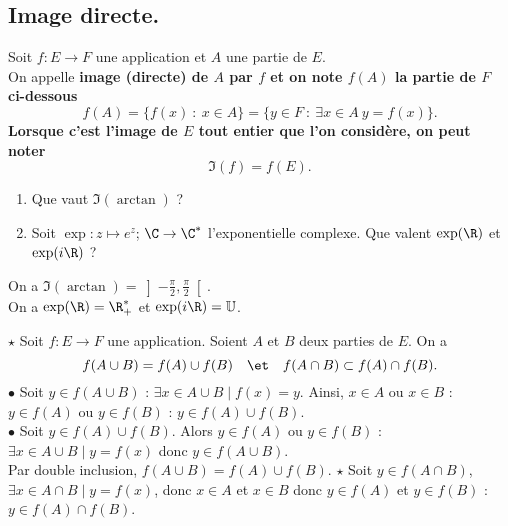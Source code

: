 \documentclass[11pt]{article}
\begin{document}
\subsection{Image directe.}

\begin{defi}{}{}
    Soit $f:E\to F$ une application et $A$ une partie de $E$.\\
    On appelle \bf{image} (directe) de $A$ par $f$ et on note $f(A)$ la partie de $F$ ci-dessous
    \begin{equation*}
        f(A) = \{f(x) ~ : ~ x\in A\} = \{y\in F ~ : ~ \exists x \in A ~ y=f(x)\}.
    \end{equation*}
    Lorsque c'est l'image de $E$ tout entier que l'on considère, on peut noter
    \begin{equation*}
        \Im(f)=f(E).
    \end{equation*}
\end{defi}

\begin{ex}{}{}
    \begin{enumerate}
        \item Que vaut $\Im(\arctan)$ ?
        \item Soit $\exp:z\mapsto e^z$; $\C\to\C^*$ l'exponentielle complexe. Que valent $\exp(\R)$ et $\exp(i\R)$ ?
    \end{enumerate}
    \tcblower
     On a $\Im(\arctan)=\left]-\frac{\pi}{2},\frac{\pi}{2}\right[$.\\
     On a $\exp(\R)=\R_+^*$ et $\exp(i\R)=\mathbb{U}$.
\end{ex}

\begin{prop}{$\star$}{}
    Soit $f:E\to F$ une application. Soient $A$ et $B$ deux parties de $E$. On a
    \begin{equation*}
        f(A\cup B) = f(A) \cup f(B) \quad\et\quad f(A\cap B)\subset f(A)\cap f(B).
    \end{equation*}
    \tcblower
    $\bullet$ Soit $y\in f(A\cup B)$ : $\exists x \in A \cup B \mid f(x) = y$. Ainsi, $x\in A$ ou $x\in B$ : $y\in f(A)$ ou $y\in f(B)$ : $y\in f(A)\cup f(B)$.\\
    $\bullet$ Soit $y\in f(A)\cup f(B)$. Alors $y\in f(A)$ ou $y\in f(B)$ : $\exists x \in A \cup B \mid y = f(x)$ donc $y\in f(A\cup B)$.\\
    Par double inclusion, $f(A\cup B) = f(A)\cup f(B)$.\n
    $\star$ Soit $y\in f(A\cap B)$, $\exists x \in A \cap B \mid y = f(x)$, donc $x\in A$ et $x\in B$ donc $y\in f(A)$ et $y\in f(B)$ : $y\in f(A)\cap f(B)$.
\end{prop}
\end{document}
